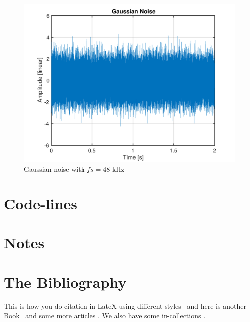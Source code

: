 \documentclass[11pt, a4paper]{article}
\begin{document}
\begin{figure}[H]
	\centering
	\includegraphics[scale=0.6]{plot_Template.pdf}
	\caption{Gaussian noise with $fs = 48$ kHz}
	\label{fig:image1}
\end{figure}

\section{Code-lines}

\section{Notes}

\section{The Bibliography}

This is how you do citation in LateX using different styles~\cite{holube2010development} and here is another Book~\cite{yost2013hearing} and some more articles \cite{verhey1999within}. We also have some in-collections \cite{bitzer2001superdirective}.




\end{document}
